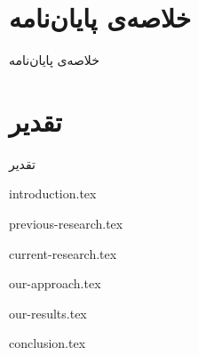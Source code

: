 \documentclass[a4paper,11px]{article}
\begin{document}
\section*{
خلاصه‌ی پایان‌نامه
}

خلاصه‌ی پایان‌نامه
\newpage

\section*{
تقدیر
}

تقدیر
\newpage


\setcounter{secnumdepth}{2}
\setcounter{tocdepth}{2}
\tableofcontents

\newpage


\listoffigures

\newpage
 
 
\listoftables

\newpage

{introduction.tex}

\newpage


{previous-research.tex}

\newpage


{current-research.tex}

\newpage


{our-approach.tex}

\newpage



{our-results.tex}

\newpage



{conclusion.tex}
\end{document}
